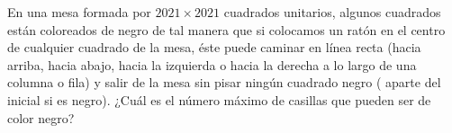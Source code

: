 En una mesa formada por $2021\times 2021$ cuadrados unitarios, algunos cuadrados están coloreados de negro de tal manera que si colocamos un ratón en el centro de cualquier cuadrado de la mesa, éste puede caminar en línea recta (hacia arriba, hacia abajo, hacia la izquierda o hacia la derecha a lo largo de una columna o fila) y salir de la mesa sin pisar ningún cuadrado negro ( aparte del inicial si es negro). ¿Cuál es el número máximo de casillas que pueden ser de color negro?
